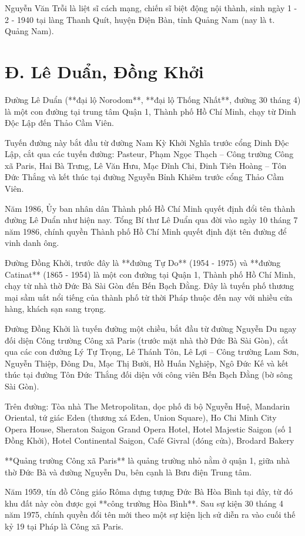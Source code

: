 Nguyễn Văn Trỗi là liệt sĩ cách mạng, chiến sĩ biệt động nội thành, sinh ngày 1 - 2 - 1940 tại làng Thanh Quít, huyện Điện Bàn, tỉnh Quảng Nam (nay là t. Quảng Nam).

\section{Đ. Lê Duẩn, Đồng Khởi}

Đường Lê Duẩn (**đại lộ Norodom**, **đại lộ Thống Nhất**, đường 30 tháng 4) là một con đường tại trung tâm Quận 1, Thành phố Hồ Chí Minh, chạy từ Dinh Độc Lập đến Thảo Cầm Viên.

Tuyến đường này bắt đầu từ đường Nam Kỳ Khởi Nghĩa trước cổng Dinh Độc Lập, cắt qua các tuyến đường: Pasteur, Phạm Ngọc Thạch – Công trường Công xã Paris, Hai Bà Trưng, Lê Văn Hưu, Mạc Đĩnh Chi, Đinh Tiên Hoàng – Tôn Đức Thắng và kết thúc tại đường Nguyễn Bỉnh Khiêm trước cổng Thảo Cầm Viên.

Năm 1986, Ủy ban nhân dân Thành phố Hồ Chí Minh quyết định đổi tên thành đường Lê Duẩn như hiện nay. Tổng Bí thư Lê Duẩn qua đời vào ngày 10 tháng 7 năm 1986, chính quyền Thành phố Hồ Chí Minh quyết định đặt tên đường để vinh danh ông.

Đường Đồng Khởi, trước đây là **đường Tự Do** (1954 - 1975) và **đường Catinat** (1865 - 1954) là một con đường tại Quận 1, Thành phố Hồ Chí Minh, chạy từ nhà thờ Đức Bà Sài Gòn đến Bến Bạch Đằng. Đây là tuyến phố thương mại sầm uất nổi tiếng của thành phố từ thời Pháp thuộc đến nay với nhiều cửa hàng, khách sạn sang trọng.

Đường Đồng Khởi là tuyến đường một chiều, bắt đầu từ đường Nguyễn Du ngay đối diện Công trường Công xã Paris (trước mặt nhà thờ Đức Bà Sài Gòn), cắt qua các con đường Lý Tự Trọng, Lê Thánh Tôn, Lê Lợi – Công trường Lam Sơn, Nguyễn Thiệp, Đông Du, Mạc Thị Bưởi, Hồ Huấn Nghiệp, Ngô Đức Kế và kết thúc tại đường Tôn Đức Thắng đối diện với công viên Bến Bạch Đằng (bờ sông Sài Gòn).

Trên đường: Tòa nhà The Metropolitan, dọc phố đi bộ Nguyễn Huệ, Mandarin Oriental, tứ giác Eden (thương xá Eden, Union Square), Ho Chi Minh City Opera House, Sheraton Saigon Grand Opera Hotel, Hotel Majestic Saigon (số 1 Đồng Khởi), Hotel Continental Saigon, Café Givral (đóng cửa), Brodard Bakery

**Quảng trường Công xã Paris** là quảng trường nhỏ nằm ở quận 1, giữa nhà thờ Đức Bà và đường Nguyễn Du, bên cạnh là Bưu điện Trung tâm.

Năm 1959, tín đồ Công giáo Rôma dựng tượng Đức Bà Hòa Bình tại đây, từ đó khu đất này còn được gọi **công trường Hòa Bình**. Sau sự kiện 30 tháng 4 năm 1975, chính quyền đổi tên mới theo một sự kiện lịch sử diễn ra vào cuối thế kỷ 19 tại Pháp là Công xã Paris.

